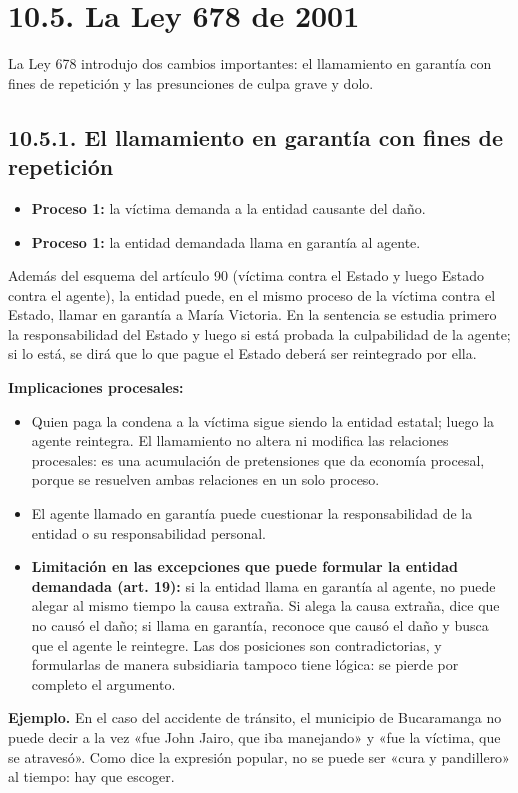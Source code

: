 \section{10.5. La Ley 678 de 2001}
La Ley 678 introdujo dos cambios importantes: el llamamiento en garantía con fines de repetición y las presunciones de culpa grave y dolo.

\subsection{10.5.1. El llamamiento en garantía con fines de repetición}
\begin{itemize}
\item \textbf{Proceso 1:} la víctima demanda a la entidad causante del daño.
\item \textbf{Proceso 1:} la entidad demandada llama en garantía al agente.
\end{itemize}
Además del esquema del artículo 90 (víctima contra el Estado y luego Estado contra el agente), la entidad puede, en el mismo proceso de la víctima contra el Estado, llamar en garantía a María Victoria. En la sentencia se estudia primero la responsabilidad del Estado y luego si está probada la culpabilidad de la agente; si lo está, se dirá que lo que pague el Estado deberá ser reintegrado por ella.

\textbf{Implicaciones procesales:}

\begin{itemize}
\item Quien paga la condena a la víctima sigue siendo la entidad estatal; luego la agente reintegra. El llamamiento no altera ni modifica las relaciones procesales: es una acumulación de pretensiones que da economía procesal, porque se resuelven ambas relaciones en un solo proceso.
\item El agente llamado en garantía puede cuestionar la responsabilidad de la entidad o su responsabilidad personal.
\item \textbf{Limitación en las excepciones que puede formular la entidad demandada (art. 19):} si la entidad llama en garantía al agente, no puede alegar al mismo tiempo la causa extraña. Si alega la causa extraña, dice que no causó el daño; si llama en garantía, reconoce que causó el daño y busca que el agente le reintegre. Las dos posiciones son contradictorias, y formularlas de manera subsidiaria tampoco tiene lógica: se pierde por completo el argumento.
\end{itemize}
\begin{ejemplo}
\textcolor[HTML]{4F6228}{\textbf{Ejemplo. }}En el caso del accidente de tránsito, el municipio de Bucaramanga no puede decir a la vez «fue John Jairo, que iba manejando» y «fue la víctima, que se atravesó». Como dice la expresión popular, no se puede ser «cura y pandillero» al tiempo: hay que escoger.
\end{ejemplo}
